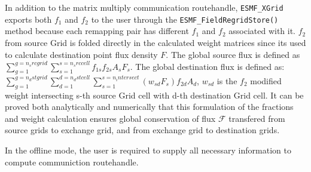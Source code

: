 In addition to the matrix multiply communication routehandle, 
{\tt ESMF\_XGrid} exports both $f_1$ and $f_2$ to the user through the {\tt ESMF\_FieldRegridStore()} method
because each remapping pair has different $f_1$ and $f_2$ associated with it. $f_2$ from source Grid is 
folded directly in the calculated weight matrices since its used to calculate destination point flux
density $F$. The global source flux is defined as $\sum_{g=1}^{g=n_srcgrid}\sum_{s=1}^{s=n_srccell}{ f_{1s} f_{2s} A_s F_s }$.
The global destination flux is defined as: 
$\sum_{g=1}^{g=n_dstgrid}\sum_{d=1}^{d=n_dstcell}{ \sum_{s=1}^{s=n_intersect}(w_{sd} F_s) f_{2d} A_d}$, $w_{sd}$ is the
$f_2$ modified weight intersecting s-th source Grid cell with d-th destination Grid cell.
It can be proved both analytically and numerically that this formulation of the fractions and 
weight calculation ensures global conservation of
flux $\mathcal{F}$ transfered from source grids to exchange grid, and from exchange grid to destination grids.

In the offline mode, the user is required to supply all necessary information to 
compute communiction routehandle.

